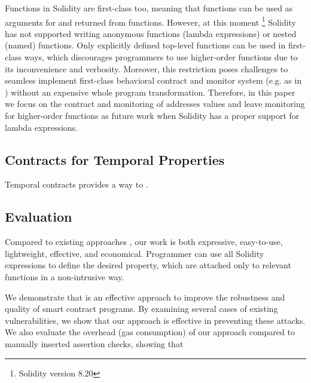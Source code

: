 Functions in Solidity are first-class too, meaning that functions can be used as
arguments for and returned from functions. However, at this moment
\footnote{Solidity version 8.20} Solidity has not supported writing anonymous
functions (lambda expressions) or nested (named) functions.
Only explicitly defined top-level functions can be used in first-class ways,
which discourages programmers to use higher-order functions due to its
inconvenience and verbosity.
Moreover, this restriction poses challenges to seamless implement first-class
behavioral contract and monitor system (e.g. as in \cite{DBLP:conf/icfp/FindlerF02})
without an expensive whole program transformation.
Therefore, in this paper we focus on the contract and monitoring of addresses values
and leave monitoring for higher-order functions as future work when
Solidity has a proper support for lambda expressions.


\subsection*{\textbf{Contracts for Temporal Properties}}

Temporal contracts provides a way to .

\subsection*{\textbf{Evaluation}}

Compared to existing approaches , our work is both expressive,
easy-to-use, lightweight, effective, and economical.
Programmer can use all Solidity expressions to define the desired property,
which are attached only to relevant functions in a non-intrusive way.

We demonstrate that \lang is an effective approach to improve the robustness
and quality of smart contract programs.
By examining several cases of existing vulnerabilities, we show that our
approach is effective in preventing these attacks.
We also evaluate the overhead (gas consumption) of our approach compared to
manually inserted assertion checks, showing that 



